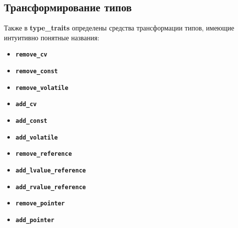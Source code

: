\subsection{Трансформирование типов}
Также в \textbf{type\_traits} определены средства трансформации типов, имеющие интуитивно понятные названия:
\begin{itemize}
\item 	\texttt{\textbf{remove\_cv}}
\item	\texttt{\textbf{remove\_const}}
\item	\texttt{\textbf{remove\_volatile}}
\item	\texttt{\textbf{add\_cv}}
\item	\texttt{\textbf{add\_const}}
\item	\texttt{\textbf{add\_volatile}}
\item	\texttt{\textbf{remove\_reference}}
\item	\texttt{\textbf{add\_lvalue\_reference}}
\item	\texttt{\textbf{add\_rvalue\_reference}}
\item	\texttt{\textbf{remove\_pointer}}
\item	\texttt{\textbf{add\_pointer}}
\end{itemize}